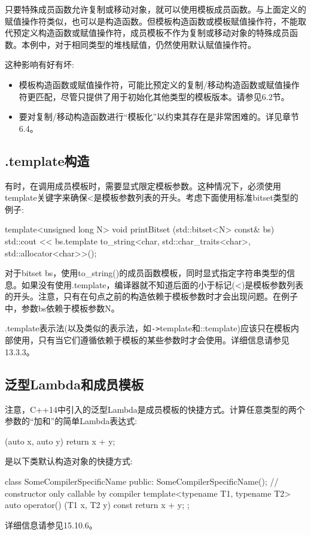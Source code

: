 只要特殊成员函数允许复制或移动对象，就可以使用模板成员函数。与上面定义的赋值操作符类似，也可以是构造函数。但模板构造函数或模板赋值操作符，不能取代预定义构造函数或赋值操作符，成员模板不作为复制或移动对象的特殊成员函数。本例中，对于相同类型的堆栈赋值，仍然使用默认赋值操作符。

这种影响有好有坏:

\begin{itemize}
\item 
模板构造函数或赋值操作符，可能比预定义的复制/移动构造函数或赋值操作符更匹配，尽管只提供了用于初始化其他类型的模板版本。请参见6.2节。

\item 
要对复制/移动构造函数进行“模板化”以约束其存在是非常困难的。详见章节6.4。
\end{itemize}

\subsection{.template构造}

有时，在调用成员模板时，需要显式限定模板参数。这种情况下，必须使用template关键字来确保<是模板参数列表的开头。考虑下面使用标准bitset类型的例子:

\begin{cpp}
template<unsigned long N>
void printBitset (std::bitset<N> const& bs) {
	std::cout << bs.template to_string<char, std::char_traits<char>,
			std::allocator<char>>();
}
\end{cpp}

对于bitset bs，使用to\_string()的成员函数模板，同时显式指定字符串类型的信息。如果没有使用.template，编译器就不知道后面的小于标记(<)是模板参数列表的开头。注意，只有在句点之前的构造依赖于模板参数时才会出现问题。在例子中，参数bs依赖于模板参数N。

.template表示法(以及类似的表示法，如\texttt{->}template和::template)应该只在模板内部使用，只有当它们遵循依赖于模板的某些参数时才会使用。详细信息请参见13.3.3。

\subsection{泛型Lambda和成员模板}

注意，C++14中引入的泛型Lambda是成员模板的快捷方式。计算任意类型的两个参数的“加和”的简单Lambda表达式:

\begin{cpp}
[] (auto x, auto y) {
	return x + y;
}
\end{cpp}

是以下类默认构造对象的快捷方式:

\begin{cpp}
class SomeCompilerSpecificName {
	public:
	SomeCompilerSpecificName(); // constructor only callable by compiler
	template<typename T1, typename T2>
	auto operator() (T1 x, T2 y) const {
		return x + y;
	}
};
\end{cpp}

详细信息请参见15.10.6。







